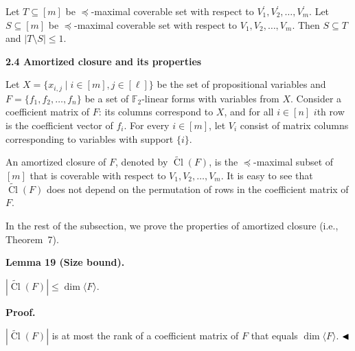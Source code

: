 \documentclass[10pt,a4paper]{article}
\begin{document}
Let $T\subseteq[m]$ be $\preceq$-maximal coverable set with respect to $V^{\prime}_{1},V^{\prime}_{2},\dots,V^{\prime}_{m}$. Let $S\subseteq[m]$ be $\preceq$-maximal coverable set with respect to $V_{1},V_{2},\dots,V_{m}$. Then $S\subseteq T$ and $|T\setminus S|\leq 1$.\par



\par\medskip\noindent\textbf{
2.4 Amortized closure and its properties}\par


Let $X=\{x_{i,j}\mid i\in[m],j\in[\ell]\}$ be the set of propositional variables and
$F=\{f_{1},f_{2},\dots,f_{n}\}$ be a set of $\mathbb{F}_{2}$-linear forms with variables from $X$. Consider a coefficient matrix of $F$: its columns correspond to $X$, and for all $i\in[n]$ $i$th row is the coefficient vector of $f_{i}$. For every $i\in[m]$, let $V_{i}$ consist of matrix columns corresponding to variables with support $\{i\}$.\par



An amortized closure of $F$, denoted by $\widetilde{\mathop{\mathrm{Cl}}}(F)$, is the $\preceq$-maximal subset of $[m]$ that is coverable with respect to $V_{1},V_{2},\dots,V_{m}$.
It is easy to see that $\widetilde{\mathop{\mathrm{Cl}}}(F)$ does not depend on the permutation of rows in the coefficient matrix of $F$.\par



In the rest of the subsection, we prove the properties of amortized closure (i.e., Theorem 7).\par



\par\medskip\noindent\textbf{
Lemma 19 (Size bound).
}\par



$|\widetilde{\mathop{\mathrm{Cl}}}(F)|\leq\dim\langle F\rangle$.\par



\par\medskip\noindent\textbf{Proof.}\par


$|\widetilde{\mathop{\mathrm{Cl}}}(F)|$ is at most the rank of a coefficient matrix of $F$ that equals $\dim\langle F\rangle$.
$\hfill\blacktriangleleft$\par
\end{document}
